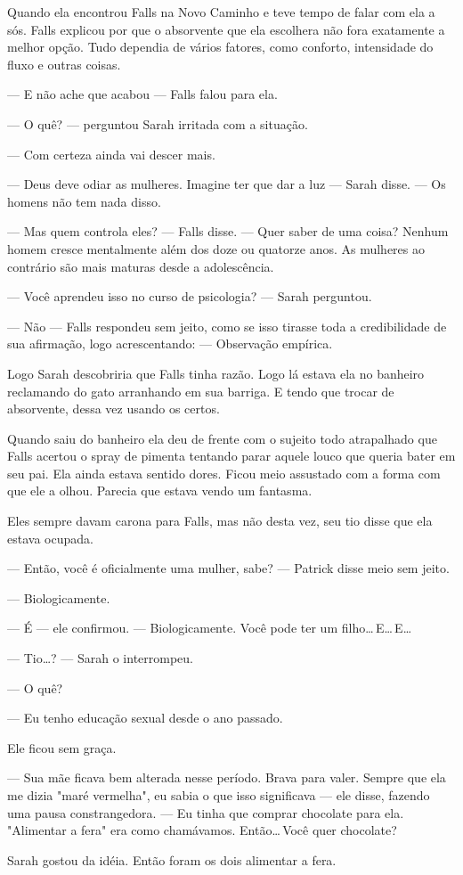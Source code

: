 Quando ela encontrou Falls na Novo Caminho e teve tempo de falar com ela a sós. Falls explicou por que o absorvente que ela escolhera não fora exatamente a melhor opção. Tudo dependia de vários fatores, como conforto, intensidade do fluxo e outras coisas.

--- E não ache que acabou --- Falls falou para ela.

--- O quê? --- perguntou Sarah irritada com a situação.

--- Com certeza ainda vai descer mais.

--- Deus deve odiar as mulheres. Imagine ter que dar a luz --- Sarah disse. --- Os homens não tem nada disso.

--- Mas quem controla eles? --- Falls disse. --- Quer saber de uma coisa? Nenhum homem cresce mentalmente além dos doze ou quatorze anos. As mulheres ao contrário são mais maturas desde a adolescência.

--- Você aprendeu isso no curso de psicologia? --- Sarah perguntou.

--- Não --- Falls respondeu sem jeito, como se isso tirasse toda a credibilidade de sua afirmação, logo acrescentando: --- Observação empírica.

Logo Sarah descobriria que Falls tinha razão. Logo lá estava ela no banheiro reclamando do gato arranhando em sua barriga. E tendo que trocar de absorvente, dessa vez usando os certos.

Quando saiu do banheiro ela deu de frente com o sujeito todo atrapalhado que Falls acertou o spray de pimenta tentando parar aquele louco que queria bater em seu pai. Ela ainda estava sentido dores. Ficou meio assustado com a forma com que ele a olhou. Parecia que estava vendo um fantasma.

Eles sempre davam carona para Falls, mas  não desta vez, seu tio disse que ela estava ocupada.

--- Então, você é oficialmente uma mulher, sabe? --- Patrick disse meio sem jeito.

--- Biologicamente.

--- É --- ele confirmou. --- Biologicamente. Você pode ter um filho\ldots\,E\ldots\,E\ldots

--- Tio\ldots? --- Sarah o interrompeu.

--- O quê?

--- Eu tenho educação sexual desde o ano passado.

Ele ficou sem graça.

--- Sua mãe ficava bem alterada nesse período. Brava para valer. Sempre que ela me dizia "maré vermelha", eu sabia o que isso significava --- ele disse, fazendo uma pausa constrangedora. --- Eu tinha que comprar chocolate para ela. "Alimentar a fera" era como chamávamos. Então\ldots\,Você quer chocolate?

Sarah gostou da idéia. Então foram os dois alimentar a fera.
